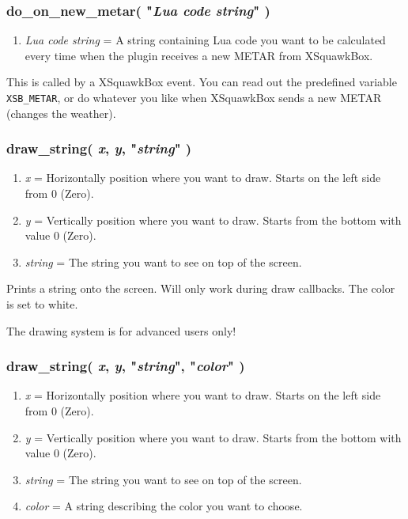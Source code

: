 \documentclass[11pt,parskip=half,a4paper]{scrartcl}
\begin{document}
\subsubsection{do\_on\_new\_metar( "\emph{Lua code string}" )}

\begin{enumerate}
	\item \emph{Lua code string} = A string containing Lua code you want to be calculated every time when the plugin receives a new METAR from XSquawkBox.
\end{enumerate}

This is called by a XSquawkBox event. You can read out the predefined variable \verb|XSB_METAR|, or do whatever you like when XSquawkBox sends a new METAR (changes the weather).

\subsubsection{draw\_string( \emph{x}, \emph{y}, "\emph{string}" )}

\begin{enumerate}
	\item \emph{x} = Horizontally position where you want to draw. Starts on the left side from 0 (Zero).
	\item \emph{y} = Vertically position where you want to draw. Starts from the bottom with value 0 (Zero).
	\item \emph{string} = The string you want to see on top of the screen.
\end{enumerate}

Prints a string onto the screen. Will only work during draw callbacks. The color is set to white.

The drawing system is for advanced users only!

\subsubsection{draw\_string( \emph{x}, \emph{y}, "\emph{string}",  "\emph{color}" )}

\begin{enumerate}
	\item \emph{x} = Horizontally position where you want to draw. Starts on the left side from 0 (Zero).
	\item \emph{y} = Vertically position where you want to draw. Starts from the bottom with value 0 (Zero).
	\item \emph{string} = The string you want to see on top of the screen.
	\item \emph{color} = A string describing the color you want to choose.
\end{enumerate}
\end{document}

